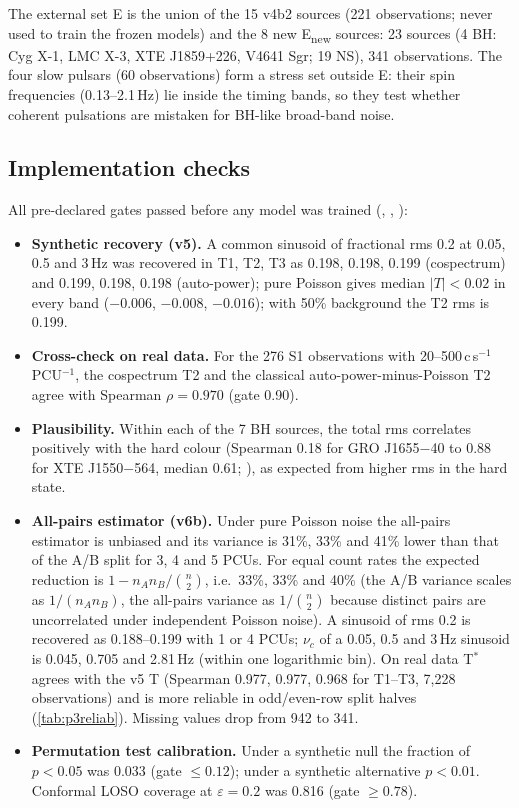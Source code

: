 The external set E is the union of the 15 v4b2 sources (221 observations; never used to train the frozen models) and
the 8 new E\textsubscript{new} sources: 23 sources (4 BH: Cyg X-1, LMC X-3, XTE J1859+226, V4641 Sgr; 19 NS),
341 observations. The four slow pulsars (60 observations) form a stress set outside E: their spin frequencies
(0.13--2.1\,Hz) lie inside the timing bands, so they test whether coherent pulsations are mistaken for BH-like
broad-band noise.

\subsection{Implementation checks}
All pre-declared gates passed before any model was trained (,
, ):
\begin{itemize}
\item \textbf{Synthetic recovery (v5).} A common sinusoid of fractional rms 0.2 at 0.05, 0.5 and 3\,Hz was recovered in
T1, T2, T3 as 0.198, 0.198, 0.199 (cospectrum) and 0.199, 0.198, 0.198 (auto-power); pure Poisson gives median $|T|<0.02$
in every band ($-0.006$, $-0.008$, $-0.016$); with 50\% background the T2 rms is 0.199.
\item \textbf{Cross-check on real data.} For the 276 S1 observations with 20--500\,c\,s$^{-1}$\,PCU$^{-1}$, the cospectrum T2
and the classical auto-power-minus-Poisson T2 agree with Spearman $\rho=0.970$ (gate 0.90).
\item \textbf{Plausibility.} Within each of the 7 BH sources, the total rms correlates positively with the hard colour
(Spearman 0.18 for GRO J1655$-$40 to 0.88 for XTE J1550$-$564, median 0.61; ),
as expected from higher rms in the hard state.
\item \textbf{All-pairs estimator (v6b).} Under pure Poisson noise the all-pairs estimator is unbiased and its variance is
31\%, 33\% and 41\% lower than that of the A/B split for 3, 4 and 5 PCUs. For equal count rates the expected reduction
is $1-n_An_B/\binom{n}{2}$, i.e.\ 33\%, 33\% and 40\% (the A/B variance scales as $1/(n_An_B)$, the all-pairs
variance as $1/\binom n2$ because distinct pairs are uncorrelated under independent Poisson noise). A sinusoid of rms 0.2 is
recovered as 0.188--0.199 with 1 or 4 PCUs; $\nu_c$ of a 0.05, 0.5 and 3\,Hz sinusoid is 0.045, 0.705 and 2.81\,Hz (within
one logarithmic bin). On real data T$^*$ agrees with the v5 T (Spearman 0.977, 0.977, 0.968 for T1--T3, 7,228 observations)
and is more reliable in odd/even-row split halves (\cref{tab:p3reliab}). Missing values drop from 942 to 341.
\item \textbf{Permutation test calibration.} Under a synthetic null the fraction of $p<0.05$ was 0.033 (gate $\le0.12$); under
a synthetic alternative $p<0.01$. Conformal LOSO coverage at $\varepsilon=0.2$ was 0.816 (gate $\ge0.78$).
\end{itemize}

